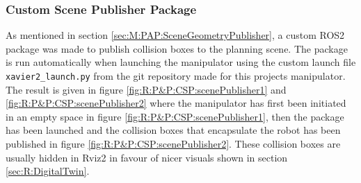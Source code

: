 
\subsubsection{Custom Scene Publisher Package}
As mentioned in section \ref{sec:M:PAP:SceneGeometryPublisher}, a custom ROS2 package was made to publish collision boxes to the planning scene. The package is run automatically when launching the manipulator using the custom launch file \lstinline{xavier2_launch.py} from the git repository made for this projects manipulator\cite{husky_vx300_repo}. The result is given in figure \ref{fig:R:P&P:CSP:scenePublisher1} and  \ref{fig:R:P&P:CSP:scenePublisher2} where the manipulator has first been initiated in an empty space in figure \ref{fig:R:P&P:CSP:scenePublisher1}, then the package has been launched and the collision boxes that encapsulate the robot has been published in figure \ref{fig:R:P&P:CSP:scenePublisher2}. These collision boxes are usually hidden in Rviz2 in favour of nicer visuals shown in section \ref{sec:R:DigitalTwin}.

